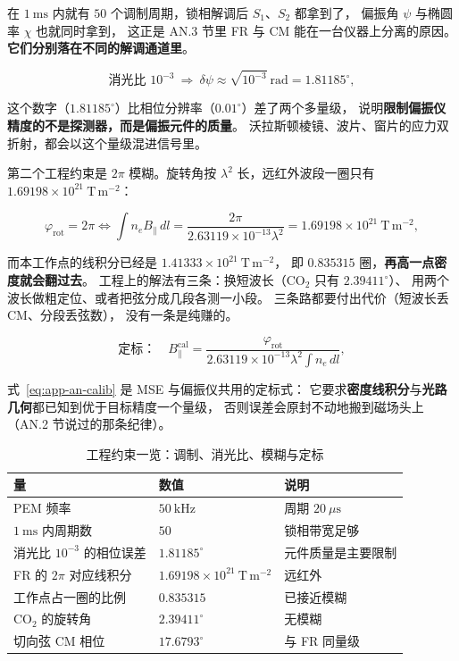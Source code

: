 在 $1\ \mathrm{ms}$ 内就有 $50$ 个调制周期，锁相解调后 $S_1$、$S_2$ 都拿到了，
偏振角 $\psi$ 与椭圆率 $\chi$ 也就同时拿到，
这正是 AN.3 节里 FR 与 CM 能在一台仪器上分离的原因。
\textbf{它们分别落在不同的解调通道里}。

\begin{equation}
\text{消光比 }10^{-3}\ \Rightarrow\ \delta\psi\approx\sqrt{10^{-3}}\ \mathrm{rad}=1.81185^\circ,
\label{eq:app-an-extinction}
\end{equation}

这个数字（$1.81185^\circ$）比相位分辨率（$0.01^\circ$）差了两个多量级，
说明\textbf{限制偏振仪精度的不是探测器，而是偏振元件的质量}。
沃拉斯顿棱镜、波片、窗片的应力双折射，都会以这个量级混进信号里。

第二个工程约束是 $2\pi$ 模糊。旋转角按 $\lambda^2$ 长，远红外波段一圈只有 $1.69198\times10^{21}\ \mathrm{T\,m^{-2}}$：

\begin{equation}
\varphi_{\mathrm{rot}}=2\pi
\iff
\int n_eB_\parallel\,dl=\frac{2\pi}{2.63119\times10^{-13}\lambda^2}
=1.69198\times10^{21}\ \mathrm{T\,m^{-2}},
\label{eq:app-an-ambiguity}
\end{equation}

而本工作点的线积分已经是 $1.41333\times10^{21}\ \mathrm{T\,m^{-2}}$，
即 $0.835315$ 圈，\textbf{再高一点密度就会翻过去}。
工程上的解法有三条：换短波长（CO$_2$ 只有 $2.39411^\circ$）、
用两个波长做粗定位、或者把弦分成几段各测一小段。
三条路都要付出代价（短波长丢 CM、分段丢弦数），
没有一条是纯赚的。

\begin{equation}
\text{定标：}\quad
B_\parallel^{\mathrm{cal}}=\frac{\varphi_{\mathrm{rot}}}{2.63119\times10^{-13}\lambda^2\!\int n_e\,dl},
\label{eq:app-an-calib}
\end{equation}

式~\eqref{eq:app-an-calib} 是 MSE 与偏振仪共用的定标式：
它要求\textbf{密度线积分}与\textbf{光路几何}都已知到优于目标精度一个量级，
否则误差会原封不动地搬到磁场头上（AN.2 节说过的那条纪律）。

\begin{table}[htbp]
\centering
\caption{工程约束一览：调制、消光比、模糊与定标}
\label{tab:app-an-engineering}
\small
\begin{tabular}{p{4.4cm} p{3.4cm} p{5.6cm}}
\toprule
量 & 数值 & 说明 \\
\midrule
PEM 频率 & $50\ \mathrm{kHz}$ & 周期 $20\ \mu\mathrm{s}$ \\
$1\ \mathrm{ms}$ 内周期数 & $50$ & 锁相带宽足够 \\
消光比 $10^{-3}$ 的相位误差 & $1.81185^\circ$ & 元件质量是主要限制 \\
FR 的 $2\pi$ 对应线积分 & $1.69198\times10^{21}\ \mathrm{T\,m^{-2}}$ & 远红外 \\
工作点占一圈的比例 & $0.835315$ & 已接近模糊 \\
CO$_2$ 的旋转角 & $2.39411^\circ$ & 无模糊 \\
切向弦 CM 相位 & $17.6793^\circ$ & 与 FR 同量级 \\
\bottomrule
\end{tabular}
\end{table}

